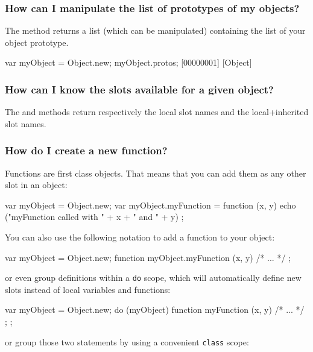 \subsubsection{How can I manipulate the list of prototypes of my objects?}
The  method returns a list (which can be manipulated)
containing the list of your object prototype.

\begin{urbiunchecked}
var myObject = Object.new;
myObject.protos;
[00000001] [Object]
\end{urbiunchecked}

\subsubsection{How can I know the slots available for a given object?}
The  and 
methods return respectively the local slot names and the local+inherited
slot names.

\subsubsection{How do I create a new function?}
Functions are first class objects. That means that you can add them as
any other slot in an object:

\begin{urbiunchecked}
var myObject = Object.new;
var myObject.myFunction = function (x, y)
  { echo ("myFunction called with " + x + " and " + y) };
\end{urbiunchecked}

You can also use the following notation to add a function to your
object:

\begin{urbiunchecked}
var myObject = Object.new;
function myObject.myFunction (x, y) { /* ... */ };
\end{urbiunchecked}

\noindent
or even group definitions within a \lstinline{do} scope, which will
automatically define new slots instead of local variables and
functions:

\begin{urbiunchecked}
var myObject = Object.new;
do (myObject)
{
  function myFunction (x, y) { /* ... */ };
};
\end{urbiunchecked}

\noindent
or group those two statements by using a convenient \lstinline{class}
scope:

